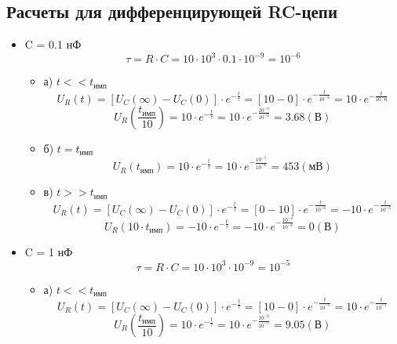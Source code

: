 \subsection{Расчеты для дифференцирующей RC-цепи}
\begin{itemize}
\item C = 0.1 нФ\\
\begin{equation}
		\tau = R \cdot C = 10 \cdot 10^3 \cdot 0.1 \cdot 10^{-9} = 10^{-6}
	\end{equation}
\begin{itemize}
\item[] а) $t << t_\text{имп}$\\
	\begin{equation}
		U_R(t) = [U_C(\infty) - U_C(0)] \cdot e^{-\frac{t}{\tau}} = [10 - 0] \cdot e^{-\frac{t}{10^{-6}}} = 10 \cdot e^{-\frac{t}{10^-6}}
	\end{equation}
	\begin{equation}
		U_R(\frac{t_\text{имп}}{10}) = 10 \cdot e^{-\frac{t}{\tau}} = 10 \cdot e^{-\frac{10^{-6}}{10^{-6}}} = 3.68 (\text{В})
	\end{equation}

\item[] б) $t = t_\text{имп}$\\
	\begin{equation}
		U_R(t_\text{имп}) = 10 \cdot e^{-\frac{t}{\tau}} = 10 \cdot e^{-\frac{10^{-5}}{10^{-6}}} = 453 (\text{мВ})
	\end{equation}
	
\item[] в) $t >> t_\text{имп}$\\
	\begin{equation}
		U_R(t) = [U_C(\infty) - U_C(0)] \cdot e^{-\frac{t}{\tau}} = [0 - 10] \cdot e^{-\frac{t}{10^{-6}}} = -10 \cdot e^{-\frac{t}{10^{-6}}}
	\end{equation}
	\begin{equation}
		U_R(10 \cdot t_\text{имп}) = -10 \cdot e^{-\frac{t}{\tau}} = -10 \cdot e^{-\frac{10^{-4}}{10^{-6}}} = 0 (\text{В})
	\end{equation}
\end{itemize}

\item C = 1 нФ\\
\begin{equation}
		\tau = R \cdot C = 10 \cdot 10^3 \cdot 10^{-9} = 10^{-5}
	\end{equation}
\begin{itemize}
\item[] а) $t << t_\text{имп}$\\
	\begin{equation}
		U_R(t) = [U_C(\infty) - U_C(0)] \cdot e^{-\frac{t}{\tau}} = [10 - 0] \cdot e^{-\frac{t}{10^{-5}}} = 10 \cdot e^{-\frac{t}{10^{-5}}}
	\end{equation}
	\begin{equation}
		U_R(\frac{t_\text{имп}}{10}) = 10 \cdot e^{-\frac{t}{\tau}} = 10 \cdot e^{-\frac{10^{-6}}{10^{-5}}} = 9.05 (\text{В})
	\end{equation}


\end{itemize}
\end{itemize}
